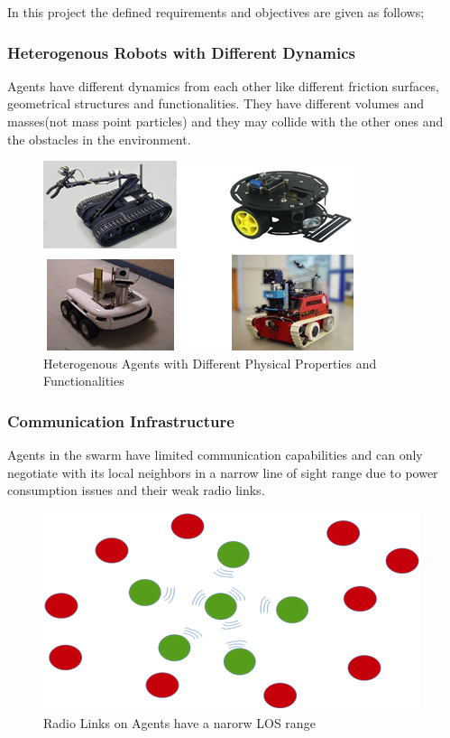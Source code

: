 \documentclass[twoside]{article}
\begin{document}
In this project the defined requirements and objectives are given as follows;

\subsubsection{Heterogenous Robots with Different Dynamics}


Agents have different dynamics from each other like different friction surfaces, geometrical structures and functionalities. They have different volumes and masses(not mass point particles) and they may collide with the other ones and the obstacles in the environment. 


	\begin{figure}[H]
		\caption{Heterogenous Agents with Different Physical Properties and Functionalities}
		\centering
		\includegraphics[scale = 1]{heterogenous}
	\end{figure} 
	
	

\subsubsection{Communication Infrastructure}

Agents in the swarm have limited communication capabilities and can only negotiate with its local neighbors in a narrow line of sight range due to power consumption issues and their weak radio links.

\begin{figure}[H]
	\caption{Radio Links on Agents have a narorw LOS range}
	\centering
	\includegraphics[scale = 1]{narrow_los}
\end{figure} 
\end{document}
